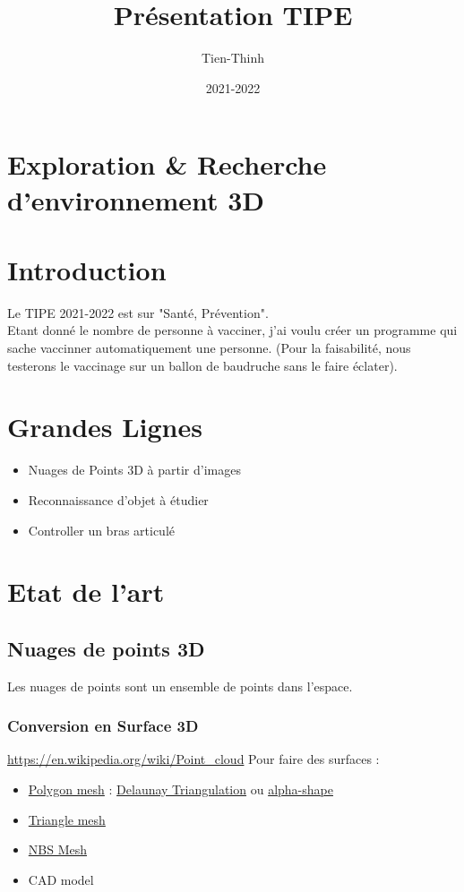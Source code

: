 \documentclass[12pt,a4paper]{article}
\author{Tien-Thinh}
\title{Présentation TIPE}
\date{2021-2022}
\begin{document}
\maketitle
\section*{Exploration \& Recherche d'environnement 3D}

\section{Introduction}
Le TIPE 2021-2022 est sur "Santé, Prévention". \\
Etant donné le nombre de personne à vacciner, j'ai voulu créer un programme qui sache vaccinner automatiquement une personne. (Pour la faisabilité, nous testerons le vaccinage sur un ballon de baudruche sans le faire éclater).

\section{Grandes Lignes}
\begin{itemize}
\item Nuages de Points 3D à partir d'images
\item Reconnaissance d'objet à étudier 
\item Controller un bras articulé
\end{itemize} 

\section{Etat de l'art}
\subsection{Nuages de points 3D}
Les nuages de points sont un ensemble de points dans l'espace.
\subsubsection{Conversion en Surface 3D}
\url{https://en.wikipedia.org/wiki/Point_cloud}
Pour faire des surfaces : 
\begin{itemize}
\item \href{https://en.wikipedia.org/wiki/Polygon_mesh}{Polygon mesh} : \href{https://en.wikipedia.org/wiki/Delaunay_triangulation}{Delaunay Triangulation} ou \href{https://en.wikipedia.org/wiki/Alpha_shape}{alpha-shape}
\item \href{https://en.wikipedia.org/wiki/Triangle_mesh}{Triangle mesh}
\item \href{https://en.wikipedia.org/wiki/Non-uniform_rational_B-spline}{NBS Mesh}
\item CAD model
\end{itemize}
\end{document}

